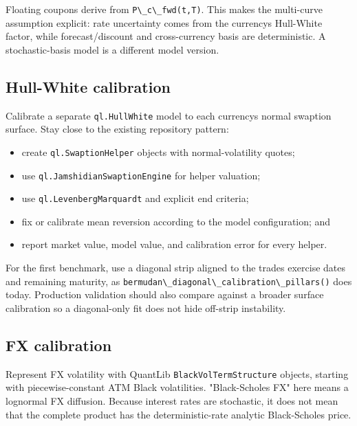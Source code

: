 \documentclass[conference]{IEEEtran}
\newcommand{\passthrough}[1]{#1}
\providecommand{\tightlist}{}
\begin{document}
Floating coupons derive from \passthrough{\lstinline!P\_c\_fwd(t,T)!}.
This makes the multi-curve assumption explicit: rate uncertainty comes
from the currency\textquotesingle s Hull-White factor, while
forecast/discount and cross-currency basis are deterministic. A
stochastic-basis model is a different model version.

\subsection{Hull-White calibration}\label{52-hull-white-calibration}

Calibrate a separate \passthrough{\lstinline!ql.HullWhite!} model to
each currency\textquotesingle s normal swaption surface. Stay close to
the existing repository pattern:

\begin{itemize}
\tightlist
\item
  create \passthrough{\lstinline!ql.SwaptionHelper!} objects with
  normal-volatility quotes;
\item
  use \passthrough{\lstinline!ql.JamshidianSwaptionEngine!} for helper
  valuation;
\item
  use \passthrough{\lstinline!ql.LevenbergMarquardt!} and explicit end
  criteria;
\item
  fix or calibrate mean reversion according to the model configuration;
  and
\item
  report market value, model value, and calibration error for every
  helper.
\end{itemize}

For the first benchmark, use a diagonal strip aligned to the
trade\textquotesingle s exercise dates and remaining maturity, as
\passthrough{\lstinline!bermudan\_diagonal\_calibration\_pillars()!}
does today. Production validation should also compare against a broader
surface calibration so a diagonal-only fit does not hide off-strip
instability.

\subsection{FX calibration}\label{53-fx-calibration}

Represent FX volatility with QuantLib
\passthrough{\lstinline!BlackVolTermStructure!} objects, starting with
piecewise-constant ATM Black volatilities. "Black-Scholes FX" here means
a lognormal FX diffusion. Because interest rates are stochastic, it does
not mean that the complete product has the deterministic-rate analytic
Black-Scholes price.
\end{document}

